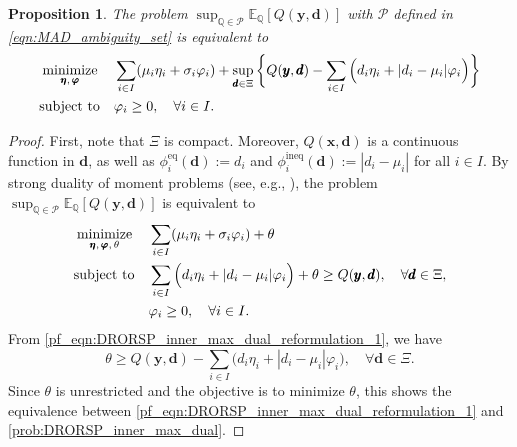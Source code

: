 \documentclass[preprint,review,11pt]{elsarticle}
\newtheorem{prop}[thm]{Proposition}
\theoremstyle{definition}
\theoremstyle{remark}
\newcommand{\E}{\mathbb{E}}
\newcommand{\Q}{\mathbb{Q}}
\newcommand{\calP}{\mathcal{P}}
\newcommand{\xb}{\pmb{x}}
\newcommand{\yb}{\pmb{y}}
\newcommand{\db}{\pmb{d}}
\newcommand{\etab}{\pmb{\eta}}
\newcommand{\vphib}{\pmb{\varphi}}
\begin{document}
\begin{prop} \label{prop:DRORSP_inner_max_dual_reformulation}
The problem $\sup_{\Q\in\calP} \E_\Q[Q(\yb,\db)]$ with $\calP$ defined in \eqref{eqn:MAD_ambiguity_set} is equivalent to
%
\begin{subequations}
\begin{align}
\underset{\etab,\,\vphib}{\textup{minimize}}\, \quad
&  \sum_{i\in I} (\mu_i\eta_i + \sigma_i\varphi_i) + \sup_{\db\in\Xi}\bigg\{ Q(\yb,\db)- \sum_{i\in I}\Big( d_i\eta_i + |d_i-\mu_i| \varphi_i \Big) \bigg\} \\
\textup{subject to} \quad
& \varphi_i\geq 0,\quad\forall i\in I.
\end{align} \label{prob:DRORSP_inner_max_dual}%
\end{subequations}  \vspace{-10mm}
\end{prop}
%
\begin{proof}
First, note that $\Xi$ is compact. Moreover, $Q(\xb,\db)$ is a continuous function in $\db$, as well as $\phi^\text{eq}_{i}(\db) := d_i$ and $\phi^\text{ineq}_{i}(\db) := |d_i-\mu_i|$ for all $i\in I$. By strong duality of moment problems (see, e.g., ), the problem $\sup_{\Q\in\calP} \E_\Q[Q(\yb,\db)]$ is equivalent to
%
\allowdisplaybreaks
\begin{subequations}
\begin{align}
\underset{\etab,\,\vphib,\,\theta}{\textup{minimize}}\, \quad
&  \sum_{i\in I} (\mu_i\eta_i + \sigma_i\varphi_i) + \theta \\
\textup{subject to} \quad
& \sum_{i\in I}\Big( d_i\eta_i + |d_i-\mu_i| \varphi_i \Big) + \theta \geq Q(\yb,\db) ,\quad\forall \db\in\Xi, \label{pf_eqn:DRORSP_inner_max_dual_reformulation_1} \\
& \varphi_i\geq 0,\quad\forall i\in I.
\end{align}%
\end{subequations}
%
From \eqref{pf_eqn:DRORSP_inner_max_dual_reformulation_1}, we have
%
$$\theta \geq Q(\yb,\db)- \sum_{i\in I}\Big( d_i\eta_i + |d_i-\mu_i| \varphi_i \Big),\quad\forall \db\in\Xi. $$
%
Since $\theta$ is unrestricted and the objective is to minimize $\theta$, this shows the equivalence between \eqref{pf_eqn:DRORSP_inner_max_dual_reformulation_1} and \eqref{prob:DRORSP_inner_max_dual}.
\end{proof}
\end{document}
